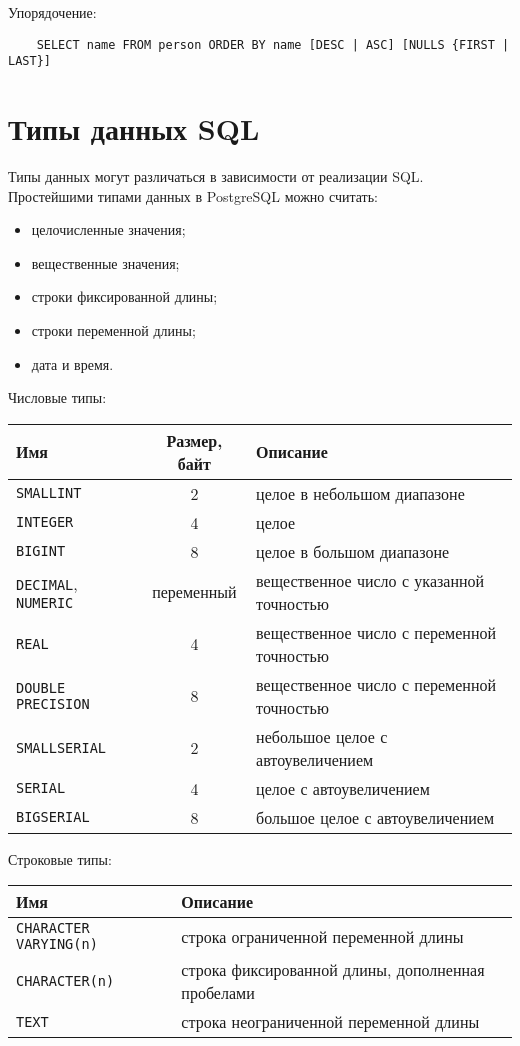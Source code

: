 Упорядочение:
\begin{verbatim}
	SELECT name FROM person ORDER BY name [DESC | ASC] [NULLS {FIRST | LAST}]
\end{verbatim}

\section{Типы данных SQL}

Типы данных могут различаться в зависимости от реализации SQL.
Простейшими типами данных в PostgreSQL можно считать:
\begin{itemize}
	\item целочисленные значения;
	\item вещественные значения;
	\item строки фиксированной длины;
	\item строки переменной длины;
	\item дата и время.
\end{itemize}

Числовые типы: \\
\begin{tabular}{l | c | l}
	\textbf{Имя} & \textbf{Размер, байт} & \textbf{Описание} \\
	\hline
	\texttt{SMALLINT} & 2 & целое в небольшом диапазоне \\
	\texttt{INTEGER} & 4 & целое \\
	\texttt{BIGINT} & 8 & целое в большом диапазоне \\
	\texttt{DECIMAL}, \texttt{NUMERIC} & переменный & вещественное число с указанной точностью \\
	\texttt{REAL} & 4 & вещественное число с переменной точностью \\
	\texttt{DOUBLE PRECISION} & 8 & вещественное число с переменной точностью \\
	\texttt{SMALLSERIAL} & 2 & небольшое целое с автоувеличением \\
	\texttt{SERIAL} & 4 & целое с автоувеличением \\
	\texttt{BIGSERIAL} & 8 & большое целое с автоувеличением
\end{tabular}

\vspace{1em}

Строковые типы: \\
\begin{tabular}{l | l}
	\textbf{Имя} & \textbf{Описание} \\
	\hline
	\texttt{CHARACTER VARYING(n)} & строка ограниченной переменной длины \\
	\texttt{CHARACTER(n)} & строка фиксированной длины, дополненная пробелами \\
	\texttt{TEXT} & строка неограниченной переменной длины
\end{tabular}

